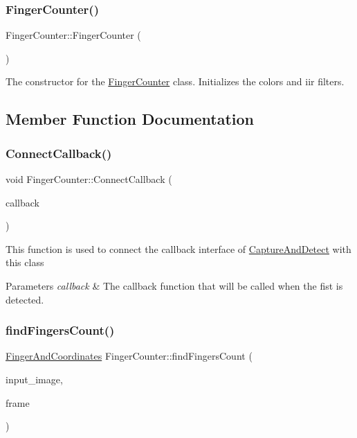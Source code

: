 \subsubsection{\texorpdfstring{Finger\+Counter()}{FingerCounter()}}
{\footnotesize\ttfamily Finger\+Counter\+::\+Finger\+Counter (\begin{DoxyParamCaption}\item[{void}]{ }\end{DoxyParamCaption})}

The constructor for the \hyperlink{classFingerCounter}{Finger\+Counter} class. Initializes the colors and iir filters. 

\subsection{Member Function Documentation}
\mbox{\label{classFingerCounter_a5b5aabaa39ff05c70a873b4c2a7869f9}} 
\subsubsection{\texorpdfstring{Connect\+Callback()}{ConnectCallback()}}
{\footnotesize\ttfamily void Finger\+Counter\+::\+Connect\+Callback (\begin{DoxyParamCaption}\item[{\hyperlink{classCaptureAndDetectCallbackInterface}{Capture\+And\+Detect\+Callback\+Interface} $\ast$}]{callback }\end{DoxyParamCaption})}

This function is used to connect the callback interface of \hyperlink{classCaptureAndDetect}{Capture\+And\+Detect} with this class


\begin{DoxyParams}{Parameters}
{\em callback} & The callback function that will be called when the fist is detected. \\
\hline
\end{DoxyParams}
\mbox{\label{classFingerCounter_a611201352a86dd943f866c1be9507081}} 
\subsubsection{\texorpdfstring{find\+Fingers\+Count()}{findFingersCount()}}
{\footnotesize\ttfamily \hyperlink{classFingerAndCoordinates}{Finger\+And\+Coordinates} Finger\+Counter\+::find\+Fingers\+Count (\begin{DoxyParamCaption}\item[{Mat}]{input\+\_\+image,  }\item[{Mat}]{frame }\end{DoxyParamCaption})}

